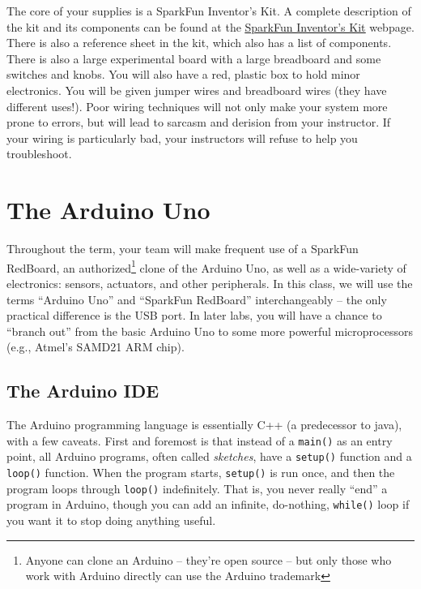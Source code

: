 \documentclass[11pt]{article} %
\begin{document}
The core of your supplies is a SparkFun Inventor’s Kit. A complete description of the kit and its components can be found at the \href{https://www.sparkfun.com/products/12060}{\underline{SparkFun Inventor’s Kit}} webpage. There is also a reference sheet in the kit, which also has a list of components. There is also a large experimental board with a large breadboard and some switches and knobs. You will also have a red, plastic box to hold minor electronics. You will be given jumper wires and breadboard wires (they have different uses!). Poor wiring techniques will not only make your system more prone to errors, but will lead to sarcasm and derision from your instructor. If your wiring is particularly bad, your instructors will refuse to help you troubleshoot.

\section*{The Arduino Uno}

Throughout the term, your team will make frequent use of a SparkFun RedBoard, an authorized\footnote{Anyone can clone an Arduino -- they’re open source -- but only those who work with Arduino directly can use the Arduino trademark} clone of the Arduino Uno, as well as a wide-variety of electronics: sensors, actuators, and other peripherals. In this class, we will use the terms “Arduino Uno” and “SparkFun RedBoard” interchangeably -- the only practical difference is the USB port. In later labs, you will have a chance to “branch out” from the basic Arduino Uno to some more powerful microprocessors (e.g., Atmel’s SAMD21 ARM chip). 

\subsection*{The Arduino IDE}


The Arduino programming language is essentially C++ (a predecessor to java), with a few caveats. First and foremost is that instead of a \verb|main()| as an entry point, all Arduino programs, often called \emph{sketches}, have a \verb|setup()| function and a \verb|loop()| function. When the program starts, \verb|setup()| is run once, and then the program loops through \verb|loop()| indefinitely. That is, you never really ``end'' a program in Arduino, though you can add an infinite, do-nothing, \verb|while()| loop if you want it to stop doing anything useful. 
\end{document}
